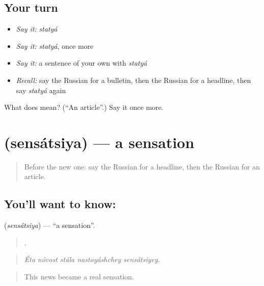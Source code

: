 \subsection*{Your turn}
\begin{itemize}
\raggedright
  \item \emph{Say it:} \emph{statyá}
  \item \emph{Say it:} \emph{statyá}, once more
  \item \emph{Say it:} a sentence of your own with \emph{statyá}
  \item \emph{Recall:} say the Russian for a bulletin, then the Russian for a headline, then say \emph{statyá} again
\end{itemize}

\begin{tcolorbox}[breakable,colback=teal!4,colframe=teal!35!black,title={Before you move on}]
What does  mean? (\textquotedblleft{}An article\textquotedblright{}.) Say it once more.
\end{tcolorbox}
\section[\texorpdfstring{\ru{сенсация} (sensátsiya)}{сенсация (sensátsiya)}]{ (sensátsiya) — a sensation}

\label{lesson:RU-C279-sensatsiya}



\begin{quote}
Before the new one: say the Russian for a headline, then the Russian for an article.
\end{quote}

\subsection*{You'll want to know: }
\textbf{} (\emph{sensátsiya}) — \textquotedblleft{}a sensation\textquotedblright{}.

\begin{quote}
    .
\end{quote}

\begin{quote}
\emph{Éta nóvost stála nastoyáshchey sensátsiyey.}
\end{quote}

\begin{quote}
This news became a real sensation.
\end{quote}

